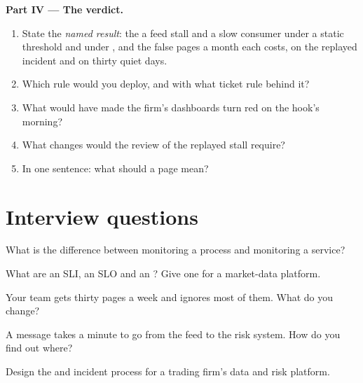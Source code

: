 \begin{problem}
\medskip\noindent\textbf{Part IV --- The verdict.}
\begin{enumerate}[resume]
\item State the \emph{named result}: the  a feed stall and a slow consumer under a static threshold and under , and the false pages a month each costs, on the replayed incident and on thirty quiet days.
\item Which rule would you deploy, and with what ticket rule behind it?
\item What would have made the firm's dashboards turn red on the hook's morning?
\item What changes would the review of the replayed stall require?
\item In one sentence: what should a page mean?
\end{enumerate}
\end{problem}

\section{Interview questions}

\begin{interviewq}\label{iq:pl:observability-and-incident-response:1}
What is the difference between monitoring a process and monitoring a service?
\end{interviewq}

\begin{interviewq}\label{iq:pl:observability-and-incident-response:2}
What are an SLI, an SLO and an ? Give one for a market-data platform.
\end{interviewq}

\begin{interviewq}\label{iq:pl:observability-and-incident-response:3}
Your team gets thirty pages a week and ignores most of them. What do you change?
\end{interviewq}

\begin{interviewq}\label{iq:pl:observability-and-incident-response:4}
A message takes a minute to go from the feed to the risk system. How do you find out where?
\end{interviewq}

\begin{interviewq}\label{iq:pl:observability-and-incident-response:5}
Design the  and incident process for a trading firm's data and risk platform.
\end{interviewq}
